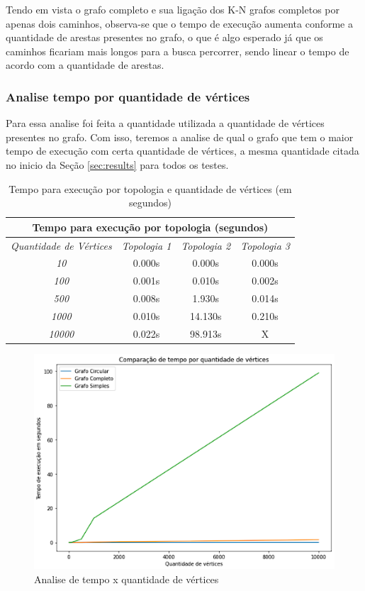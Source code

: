 Tendo em vista o grafo completo e sua ligação dos K-N grafos completos por apenas dois caminhos, observa-se que o tempo de execução aumenta conforme a quantidade de arestas presentes no grafo, o que é algo esperado já que os caminhos ficariam mais longos para a busca percorrer, sendo linear o tempo de acordo com a quantidade de arestas.

\subsubsection{Analise tempo por quantidade de vértices}

Para essa analise foi feita a quantidade utilizada a quantidade de vértices presentes no grafo. Com isso, teremos a analise de qual o grafo que tem o maior tempo de execução com certa quantidade de vértices, a mesma quantidade citada no inicio da Seção \ref{sec:results} para todos os testes.

\begin{center}
\begin{table}[ht]
    \centering
    \begin{tabular}{|c | c | c | c|}
     \hline
        \multicolumn{4}{|c|}{\textbf{Tempo para execução por topologia (segundos)}} \\
     \hline
         \emph{Quantidade de Vértices} & \emph{Topologia 1} & \emph{Topologia 2} & \emph{Topologia 3}  \\ [0.5ex] 
     \hline
         \emph{10} & 0.000s & 0.000s  & 0.000s \\ 
     \hline
         \emph{100} & 0.001s & 0.010s & 0.002s \\
     \hline
         \emph{500} & 0.008s & 1.930s & 0.014s \\
     \hline
         \emph{1000} & 0.010s & 14.130s & 0.210s \\
     \hline
         \emph{10000} & 0.022s & 98.913s  & X \\
     \hline
    \end{tabular}
        \caption{Tempo para execução por topologia e quantidade de vértices (em segundos)}
    \label{tab:tabela_topologia_agregado}
\end{table}
\end{center}

\begin{figure}[H]
    \centering
    \includegraphics[width=.6\textwidth]{figuras/comparacao.png}
    \caption{Analise de tempo x quantidade de vértices}
    \label{fig:figure50}
\end{figure}

